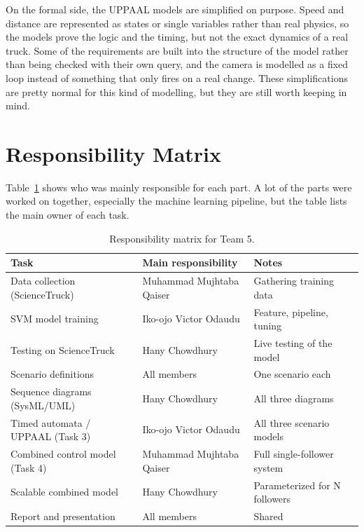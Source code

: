 \documentclass[english]{lni}
\begin{document}
On the formal side, the UPPAAL models are simplified on purpose. Speed and distance are represented as states or single variables rather than real physics, so the models prove the logic and the timing, but not the exact dynamics of a real truck. Some of the requirements are built into the structure of the model rather than being checked with their own query, and the camera is modelled as a fixed loop instead of something that only fires on a real change. These simplifications are pretty normal for this kind of modelling, but they are still worth keeping in mind.

\section{Responsibility Matrix}
Table~\ref{tab:resp} shows who was mainly responsible for each part. A lot of the parts were worked on together, especially the machine learning pipeline, but the table lists the main owner of each task.

\begin{table}[H]
	\centering
	\caption{Responsibility matrix for Team 5.}
	\label{tab:resp}
	\begin{tabular}{lll}
		\hline
		\textbf{Task} & \textbf{Main responsibility} & \textbf{Notes} \\
		\hline
		Data collection (ScienceTruck) & Muhammad Mujhtaba Qaiser & Gathering training data \\
		SVM model training & Iko-ojo Victor Odaudu & Feature, pipeline, tuning \\
		Testing on ScienceTruck & Hany Chowdhury & Live testing of the model \\
		Scenario definitions & All members & One scenario each \\
		Sequence diagrams (SysML/UML) & Hany Chowdhury & All three diagrams \\
		Timed automata / UPPAAL (Task 3) & Iko-ojo Victor Odaudu & All three scenario models \\
		Combined control model (Task 4) & Muhammad Mujhtaba Qaiser & Full single-follower system \\
		Scalable combined model & Hany Chowdhury & Parameterized for N followers \\
		Report and presentation & All members & Shared \\
		\hline
	\end{tabular}
\end{table}
\end{document}
